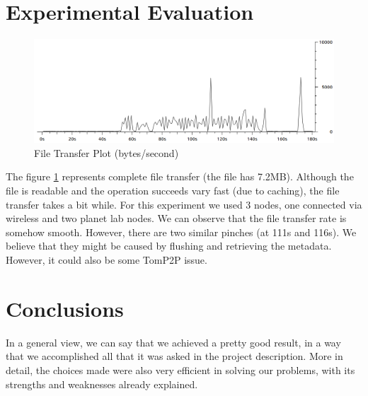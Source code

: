 \documentclass[times,9pt,article]{llncs}
\begin{document}
\section{Experimental Evaluation}

\begin{figure}
\centering
\includegraphics[keepaspectratio,width=1\textwidth]{images/file_transfer.png}
\caption{File Transfer Plot (bytes/second)}
\label{fig:file_transfer}
\end{figure}

The figure \ref{fig:file_transfer} represents complete file transfer (the file has 7.2MB). Although the file is readable and the operation succeeds vary fast (due to caching), the file transfer takes a bit while. For this experiment we used 3 nodes, one connected via wireless and two planet lab nodes. We can observe that the file transfer rate is somehow smooth. However, there are two similar pinches (at 111s and 116s). We believe that they might be caused by flushing and retrieving the metadata. However, it could also be some TomP2P issue.

\section{Conclusions}
In a general view, we can say that we achieved a pretty good result, in a way that we accomplished all that it was asked in the project description.
More in detail, the choices made were also very efficient in solving our problems, with its strengths and weaknesses already explained.
\end{document}
